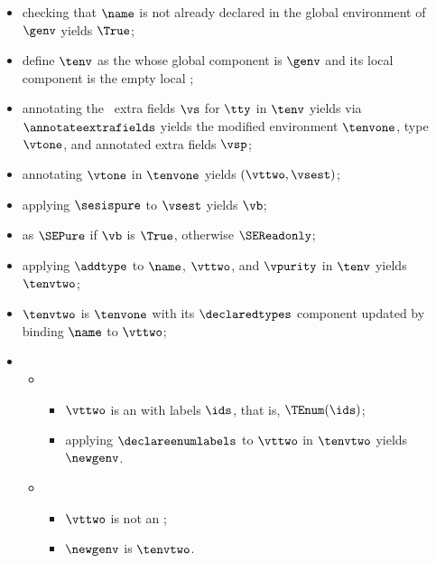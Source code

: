 \ProseParagraph
\AllApply
\begin{itemize}
  \item checking that $\name$ is not already declared in the global environment of $\genv$ yields $\True$\ProseOrTypeError;
  \item define $\tenv$ as the \staticenvironmentterm{} whose global component is $\genv$ and its local component is the empty local
        \staticenvironmentterm{};
  \item annotating the \optionalterm\ extra fields $\vs$ for $\tty$ in $\tenv$ yields via \\ $\annotateextrafields$
        yields the modified environment $\tenvone$, type $\vtone$, and annotated \optionalterm{} extra fields $\vsp$\ProseOrTypeError;
  \item annotating $\vtone$ in $\tenvone$ yields $(\vttwo, \vsest)$\ProseOrTypeError;
  \item applying $\sesispure$ to $\vsest$ yields $\vb$;
  \item \Proseeqdef{$\vpurity$} as $\SEPure$ if $\vb$ is $\True$, otherwise $\SEReadonly$;
  \item applying $\addtype$ to $\name$, $\vttwo$, and $\vpurity$ in $\tenv$ yields $\tenvtwo$;
  \item $\tenvtwo$ is $\tenvone$ with its $\declaredtypes$ component updated by binding $\name$ to $\vttwo$;
  \item \OneApplies
  \begin{itemize}
    \item {}
    \begin{itemize}
      \item $\vttwo$ is an \enumerationtypeterm{} with labels $\ids$, that is, $\TEnum(\ids)$;
      \item applying $\declareenumlabels$ to $\vttwo$ in $\tenvtwo$ yields $\newgenv$\ProseOrTypeError.
    \end{itemize}

    \item {}
    \begin{itemize}
      \item $\vttwo$ is not an \enumerationtypeterm{};
      \item $\newgenv$ is $\tenvtwo$.
    \end{itemize}
  \end{itemize}
\end{itemize}

